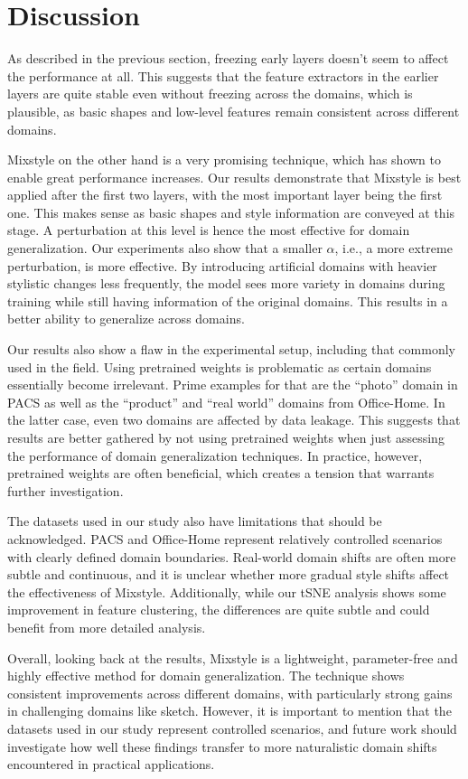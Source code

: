 \section{Discussion}

As described in the previous section, freezing early layers doesn't seem to affect the performance at all. This suggests that the feature extractors in the earlier layers are quite stable even without freezing across the domains, which is plausible, as basic shapes and low-level features remain consistent across different domains.

Mixstyle on the other hand is a very promising technique, which has shown to enable great performance increases. Our results demonstrate that Mixstyle is best applied after the first two layers, with the most important layer being the first one. This makes sense as basic shapes and style information are conveyed at this stage. A perturbation at this level is hence the most effective for domain generalization. Our experiments also show that a smaller $\alpha$, i.e., a more extreme perturbation, is more effective. By introducing artificial domains with heavier stylistic changes less frequently, the model sees more variety in domains during training while still having information of the original domains. This results in a better ability to generalize across domains.

Our results also show a flaw in the experimental setup, including that commonly used in the field. Using pretrained weights is problematic as certain domains essentially become irrelevant. Prime examples for that are the ``photo'' domain in PACS as well as the ``product'' and ``real world'' domains from Office-Home. In the latter case, even two domains are affected by data leakage. This suggests that results are better gathered by not using pretrained weights when just assessing the performance of domain generalization techniques. In practice, however, pretrained weights are often beneficial, which creates a tension that warrants further investigation.

The datasets used in our study also have limitations that should be acknowledged. PACS and Office-Home represent relatively controlled scenarios with clearly defined domain boundaries. Real-world domain shifts are often more subtle and continuous, and it is unclear whether more gradual style shifts affect the effectiveness of Mixstyle. Additionally, while our tSNE analysis shows some improvement in feature clustering, the differences are quite subtle and could benefit from more detailed analysis.

Overall, looking back at the results, Mixstyle is a lightweight, parameter-free and highly effective method for domain generalization. The technique shows consistent improvements across different domains, with particularly strong gains in challenging domains like sketch. However, it is important to mention that the datasets used in our study represent controlled scenarios, and future work should investigate how well these findings transfer to more naturalistic domain shifts encountered in practical applications.